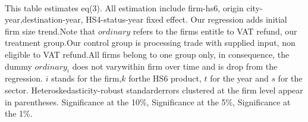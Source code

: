 \documentclass[preview]{standalone}
\begin{document}
\begin{table}[!htbp]
\begin{adjustbox}{width=\textwidth, totalheight=\baselineskip,keepaspectratio}
\end{adjustbox}
\begin{tablenotes} 
 \small 
 \item \\ 
This table estimates eq(3). All estimation include firm-hs6, origin city-year,destination-year, HS4-status-year fixed effect. Our regression adds initial firm size trend.Note that $ordinary$ refers to the firms entitle to VAT refund, our treatment group.Our control group is processing trade with supplied input, non eligible to VAT refund.All firms belong to one group only, in consequence, the dummy $ordinary_{i}$ does not varywithin firm over time and is drop from the regression. $i$ stands for the firm,$k$ forthe HS6 product, $t$ for the year and $s$ for the sector. Heteroskedasticity-robust standarderrors clustered at the firm level appear in parentheses.\sym{*} Significance at the 10\%, \sym{**} Significance at the 5\%, \sym{***} Significance at the 1\%. 
\end{tablenotes}
\end{table}
\end{document}
